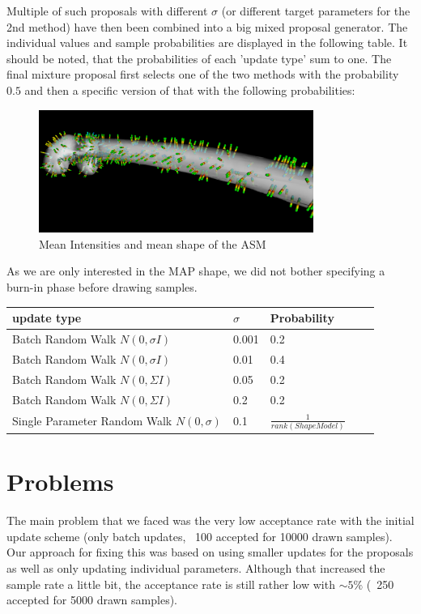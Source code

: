 \documentclass{article}
\begin{document}
	Multiple of such proposals with different $\sigma$ (or different target parameters for the 2nd method) have then been combined into a big mixed proposal generator.
	The individual values and sample probabilities are displayed in the following table.
	It should be noted, that the probabilities of each 'update type' sum to one.
	The final mixture proposal first selects one of the two methods with the probability $0.5$ and then a specific version of that with the following probabilities:
	\begin{figure}
		\centering
			\centering
			\includegraphics[width=0.8\textwidth]{images/mean_pixelintensities.png}
			\caption{Mean Intensities and mean shape of the ASM}
			\label{1.1}
	\end{figure}	
	As we are only interested in the MAP shape, we did not bother specifying a burn-in phase before drawing samples.

	\begin{center}
		\begin{tabular}{l l l l l}
			\toprule
			update type & $\sigma$ & Probability \\
			\midrule
			Batch Random Walk $N(0, \sigma I)$&  0.001 & 	0.2  	\\
			Batch Random Walk $N(0, \sigma I)$& 0.01 & 	0.4 	\\
			Batch Random Walk $N(0, \Sigma I)$& 0.05 &	0.2		\\
			Batch Random Walk $N(0, \Sigma I)$& 0.2&		0.2		\\
			Single Parameter Random Walk $N(0,\sigma)$ & 0.1& $\frac{1}{rank(ShapeModel)}$
		\end{tabular}
	\end{center}
	\section{Problems}
	The main problem that we faced was the very low acceptance rate with the initial update scheme (only batch updates, ~100 accepted for 10000 drawn samples).
	Our approach for fixing this was based on using smaller updates for the proposals as well as only updating individual parameters.
	Although that increased the sample rate a little bit, the acceptance rate is still rather low with $\sim 5\%$ (~250 accepted for 5000 drawn samples).
	
\end{document}
